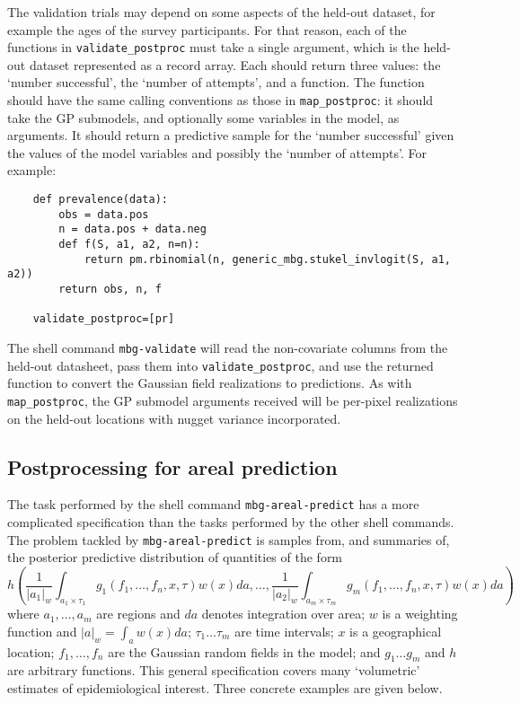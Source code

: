 The validation trials may depend on some aspects of the held-out dataset, for example the ages of the survey participants. For that reason, each of the functions in \texttt{validate\_postproc} must take a single argument, which is the held-out dataset represented as a record array. Each should return three values: the `number successful', the `number of attempts', and a function. The function should have the same calling conventions as those in \texttt{map\_postproc}: it should take the GP submodels, and optionally some variables in the model, as arguments. It should return a predictive sample for the `number successful' given the values of the model variables and possibly the `number of attempts'. For example:
\begin{verbatim}
    def prevalence(data):
        obs = data.pos
        n = data.pos + data.neg
        def f(S, a1, a2, n=n):
            return pm.rbinomial(n, generic_mbg.stukel_invlogit(S, a1, a2))
        return obs, n, f

    validate_postproc=[pr]    
\end{verbatim}

The shell command \texttt{mbg-validate} will read the non-covariate columns from the held-out datasheet, pass them into \texttt{validate\_postproc}, and use the returned function to convert the Gaussian field realizations to predictions. As with \texttt{map\_postproc}, the GP submodel arguments received will be per-pixel realizations on the held-out locations with nugget variance incorporated.

\subsection{Postprocessing for areal prediction}  

The task performed by the shell command \texttt{mbg-areal-predict} has a more complicated specification than the tasks performed by the other shell commands. The problem tackled by \texttt{mbg-areal-predict} is samples from, and summaries of, the posterior predictive distribution of quantities of the form
\begin{equation}
    \label{eq:areal-targ} 
    h\left(\frac{1}{|a_1|_w}\int_{a_1\times \tau_1} g_1(f_1,\ldots,f_n,x,\tau)w(x)da, \ldots,\frac{1}{|a_2|_w}\int_{a_m\times\tau_m} g_m(f_1,\ldots,f_n,x,\tau)w(x)da\right)
\end{equation}
where $a_1,\ldots,a_m$ are regions and $da$ denotes integration over area; $w$ is a weighting function and $|a|_w=\int_a w(x)da$; $\tau_1\ldots\tau_m$ are time intervals; $x$ is a geographical location; $f_1,\ldots,f_n$ are the Gaussian random fields in the model; and $g_1\ldots g_m$ and $h$ are arbitrary functions. This general specification covers many `volumetric' estimates of epidemiological interest. Three concrete examples are given below.

